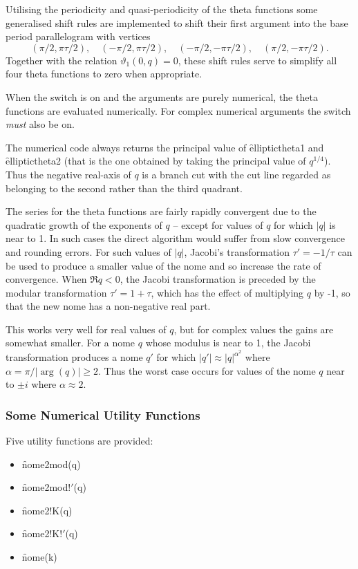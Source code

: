 Utilising the periodicity and quasi-periodicity of the theta functions
some generalised shift rules are implemented to shift their first argument
into the base period parallelogram with vertices
\[(\pi/2, \pi\tau/2),\quad (-\pi/2, \pi\tau/2),\quad (-\pi/2, -\pi\tau/2),
\quad (\pi/2, -\pi\tau/2).\]
Together with the relation $\vartheta_1(0,q)=0$, these shift rules serve to
simplify all four theta functions to zero when appropriate.

When the switch  is on and the arguments are purely numerical,
the theta functions are evaluated numerically. For complex numerical arguments
the switch  \emph{must} also be on.

The numerical code always returns the principal value of 
\f{elliptictheta1} and \f{elliptictheta2} (that is the one obtained by
taking the principal value of $q^{1/4}$).
Thus the negative real-axis of $q$ is a branch cut with the cut line
regarded as belonging to the second rather than the third quadrant.

The series for the theta functions are fairly rapidly convergent 
due to the quadratic growth of the exponents of $q$ -- except 
for values of $q$ for which $|q|$ is near to 1.  In such cases the direct algorithm 
would suffer from slow convergence and rounding errors.
For such values of $|q|$, Jacobi's transformation $\tau'=-1/\tau$ can be
used to produce a smaller value of the nome and so increase the rate of
convergence.  When $\Re q < 0$, the Jacobi transformation is preceded by the modular transformation $\tau' = 1+\tau$, which has the effect  of multiplying $q$ by -1, so that 
the new nome has a non-negative real part. 

This works very well for real values of $q$, but for complex
values the gains are somewhat smaller.
For a nome $q$ whose modulus is near to 1, the Jacobi transformation produces a nome 
$q'$ for which $|q'|  \approx  |q|^{\alpha^2}$ where $\alpha =\pi/|\arg(q)| \geq 2$.
Thus the worst case occurs for values of the nome $q$ near to $\pm i$ where 
$\alpha \approx 2$.

\subsubsection{Some Numerical Utility Functions}

Five utility functions are provided:
\begin{itemize}
\item \f{nome2mod(q)}
\item \f{nome2mod!$'$(q)}
\item \f{nome2!K(q)}
\item \f{nome2!K!$'$(q)}
\item \f{nome(k)}
\end{itemize}

